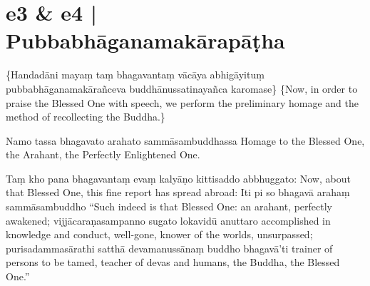 \section*{e3 \& e4 | Pubbabhāganamakārapāṭha}

\begin{chantsubsection}
  \chantnote
    {\{Handadāni mayaṃ taṃ bhagavantaṃ vācāya abhigāyituṃ pubbabhāganamakārañceva buddhānussatinayañca karomase\}}
  \chantnotetrans
    {\{Now, in order to praise the Blessed One with speech, we perform the preliminary homage and the method of recollecting the Buddha.\}}
\end{chantsubsection}
\chantgap
\begin{chantsubsection}
  \chantnote
    {Namo tassa bhagavato arahato sammāsambuddhassa}
  \chantgap
  \chantnotetrans
    {Homage to the Blessed One, the Arahant, the Perfectly Enlightened One.}
\end{chantsubsection}
\chantgap
\begin{chantsubsection}
  \chantlineinline
    {Taṃ kho pana bhagavantaṃ evaṃ kalyāṇo kittisaddo abbhuggato:}
    {Now, about that Blessed One, this fine report has spread abroad:}
  \chantlineinline
    {Iti pi so bhagavā arahaṃ sammāsambuddho}
    {“Such indeed is that Blessed One: an arahant, perfectly awakened;}
  \chantlineinline
    {vijjācaraṇasampanno sugato lokavidū anuttaro}
    {accomplished in knowledge and conduct, well-gone, knower of the worlds, unsurpassed;}
  \chantlineinline
    {purisadammasārathi satthā devamanussānaṃ buddho bhagavā’ti}
    {trainer of persons to be tamed, teacher of devas and humans, the Buddha, the Blessed One.”}
\end{chantsubsection}
